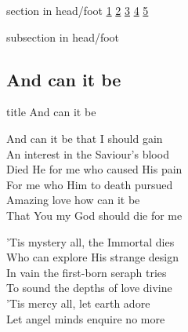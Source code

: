 \documentclass{beamer}
\begin{document}
{
{ 
 {
 \begin{beamercolorbox}[ht=4.5ex,dp=1.5ex,%
      leftskip=.3cm,rightskip=.3cm plus1fil]{section in head/foot}
 \fontsize{12}{25}\selectfont 
\hyperlink{And can it be[]1}{1}
\hyperlink{And can it be[]2}{2}
\hyperlink{And can it be[]3}{3}
\hyperlink{And can it be[]4}{4}
\hyperlink{And can it be[]5}{5}
 
 \end{beamercolorbox}%
  \begin{beamercolorbox}[ht=2.5ex,dp=1.125ex,%
   leftskip=.3cm,rightskip=.3cm plus1fil]{subsection in head/foot}
   \insertauthor
 \end{beamercolorbox}%
 }
}
\subsection{ And can it be }

\hypertarget{And can it be[]}{}
\begin{frame}{}
 \vfill
  \centering
  \begin{beamercolorbox}[sep=8pt,center,shadow=true,rounded=true]{title}
    And can it be     
  \end{beamercolorbox}
  \vfill
\end{frame}

\hypertarget{And can it be[]1}{}
\begin{frame}{}
\fontsize{ 18 }{ 23 }\selectfont

And can it be that I should gain\\ 
An interest in the Saviour's blood\\ 
Died He for me who caused His pain\\ 
For me who Him to death pursued\\ 
Amazing love how can it be\\ 
That You my God should die for me 

\end{frame}

\hypertarget{And can it be[]2}{}
\begin{frame}{}
\fontsize{ 18 }{ 23 }\selectfont

'Tis mystery all, the Immortal dies\\ 
Who can explore His strange design\\ 
In vain the first-born seraph tries\\ 
To sound the depths of love divine\\ 
'Tis mercy all, let earth adore\\ 
Let angel minds enquire no more 


\end{frame}}
\end{document}
